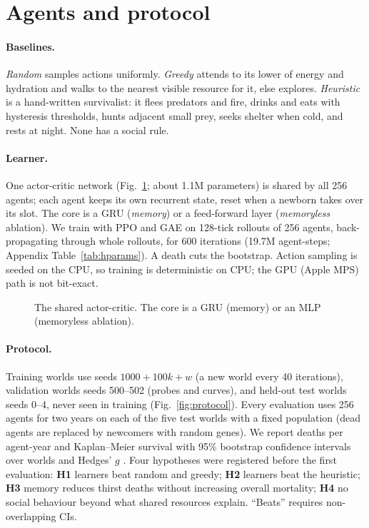 \documentclass[10pt]{article}
\begin{document}
\section{Agents and protocol}\label{sec:protocol}
\paragraph{Baselines.} \emph{Random} samples actions uniformly. \emph{Greedy} attends to its lower of energy and
hydration and walks to the nearest visible resource for it, else explores. \emph{Heuristic} is a hand-written
survivalist: it flees predators and fire, drinks and eats with hysteresis thresholds, hunts adjacent small prey, seeks
shelter when cold, and rests at night. None has a social rule.

\paragraph{Learner.} One actor-critic network (Fig.~\ref{fig:network}; about 1.1M parameters) is shared by all 256
agents; each agent keeps its own recurrent state, reset when a newborn takes over its slot. The core is a GRU
\citep{cho2014learning} (\emph{memory}) or a feed-forward layer (\emph{memoryless} ablation). We train with PPO
\citep{schulman2017proximal} and GAE \citep{schulman2016gae} on 128-tick rollouts of 256 agents, back-propagating
through whole rollouts, for 600 iterations (19.7M agent-steps; Appendix Table~\ref{tab:hparams}). A death cuts the
bootstrap. Action sampling is seeded on the CPU, so training is deterministic on CPU; the GPU (Apple MPS) path is not
bit-exact.

\begin{figure}[t]
  \centering
  \resizebox{0.95\linewidth}{!}{\networkdiagram}
  \caption{The shared actor-critic. The core is a GRU (memory) or an MLP (memoryless ablation).}
  \label{fig:network}
\end{figure}

\paragraph{Protocol.} Training worlds use seeds $1000+100k+w$ (a new world every 40 iterations), validation worlds
seeds 500--502 (probes and curves), and held-out test worlds seeds 0--4, never seen in training
(Fig.~\ref{fig:protocol}). Every evaluation uses 256 agents for two years on each of the five test worlds with a fixed
population (dead agents are replaced by newcomers with random genes). We report deaths per agent-year and
Kaplan--Meier survival \citep{kaplan1958nonparametric} with 95\% bootstrap confidence intervals over worlds
\citep{efron1993bootstrap} and Hedges' $g$ \citep{hedges1981distribution}. Four hypotheses were registered before
the first evaluation: \textbf{H1} learners beat random and greedy; \textbf{H2} learners beat the heuristic;
\textbf{H3} memory reduces thirst deaths without increasing overall mortality; \textbf{H4} no social behaviour beyond
what shared resources explain. ``Beats'' requires non-overlapping CIs.
\end{document}
